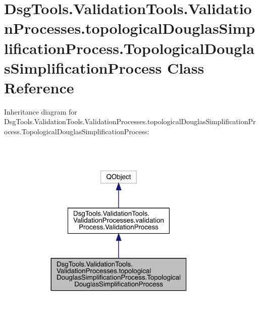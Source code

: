 \hypertarget{class_dsg_tools_1_1_validation_tools_1_1_validation_processes_1_1topological_douglas_simplificat7eb46ba2812d315c08230afeb95e4b17}{}\section{Dsg\+Tools.\+Validation\+Tools.\+Validation\+Processes.\+topological\+Douglas\+Simplification\+Process.\+Topological\+Douglas\+Simplification\+Process Class Reference}
\label{class_dsg_tools_1_1_validation_tools_1_1_validation_processes_1_1topological_douglas_simplificat7eb46ba2812d315c08230afeb95e4b17}


Inheritance diagram for Dsg\+Tools.\+Validation\+Tools.\+Validation\+Processes.\+topological\+Douglas\+Simplification\+Process.\+Topological\+Douglas\+Simplification\+Process\+:
\nopagebreak
\begin{figure}[H]
\begin{center}
\leavevmode
\includegraphics[width=281pt]{class_dsg_tools_1_1_validation_tools_1_1_validation_processes_1_1topological_douglas_simplificatc779b47ebc046f9c928d975c7bf62ddc}
\end{center}
\end{figure}


